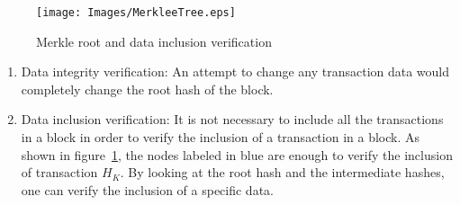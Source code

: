 \begin{figure}
	\begin{center}
		\texttt{[image: Images/MerkleeTree.eps]}
		\caption{Merkle root and data inclusion verification}
		\label{fig:merkleTree}
	\end{center}
\end{figure}
\begin{enumerate}
	\item Data integrity verification: An attempt to change any transaction data
		would completely change the root hash of the block.  
	\item Data inclusion verification:  It is not necessary to include all the
		transactions in a block in order to verify the inclusion of a
		transaction in a block. As shown in figure~\ref{fig:merkleTree}, the
		nodes labeled in blue are enough to verify the inclusion of transaction
		$H_{K}$. By looking at the root hash and the intermediate hashes, one
		can verify the inclusion of a specific data.
\end{enumerate}

